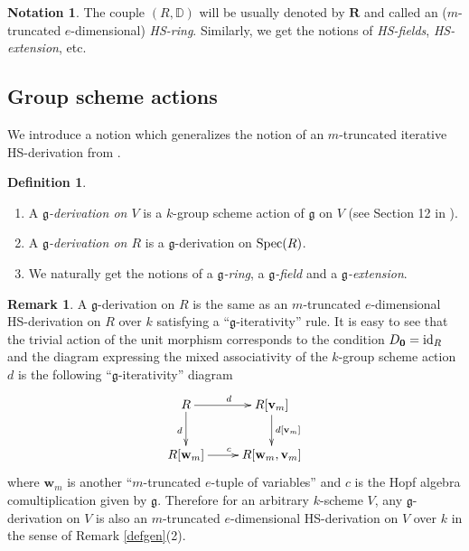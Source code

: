 \documentclass[10pt]{amsart}
\theoremstyle{definition}
\newtheorem{definition}[theorem]{Definition}
\newtheorem{remark}[theorem]{Remark}
\newtheorem{notation}[theorem]{Notation}
\begin{document}
\begin{notation}
The couple $(R,\mathbb{D})$ will be usually denoted by $\mathbf{R}$ and called an ($m$-truncated $e$-dimensional) \emph{HS-ring}. Similarly, we get the notions of \emph{HS-fields}, \emph{HS-extension}, etc.
\end{notation}



\subsection{Group scheme actions}
We introduce a notion which generalizes the notion of an $m$-truncated iterative HS-derivation from \cite{K3}.
\begin{definition}
\begin{enumerate}
\item A \emph{$\mathfrak{g}$-derivation on $V$} is a $k$-group scheme action of $\mathfrak{g}$ on $V$ (see Section 12 in \cite{MuAbel}).

\item A \emph{$\mathfrak{g}$-derivation on $R$} is a $\mathfrak{g}$-derivation on $\operatorname{Spec}(R)$.

\item We naturally get the notions of a \emph{$\mathfrak{g}$-ring}, a \emph{$\mathfrak{g}$-field} and a \emph{$\mathfrak{g}$-extension}.
\end{enumerate}
\end{definition}
\begin{remark}\label{gderint}
A $\mathfrak{g}$-derivation on $R$ is the same as an $m$-truncated $e$-dimensional
HS-derivation on $R$ over $k$ satisfying a ``$\mathfrak{g}$-iterativity'' rule. It is easy to see that the trivial action of the unit morphism corresponds
to the condition $D_{\mathbf{0}}=\operatorname{id}_R$ and the diagram expressing the mixed associativity of the $k$-group scheme action $d$ is the following ``$\mathfrak{g}$-iterativity'' diagram
\begin{equation*}
\xymatrix{R \ar[r]^d \ar[d]_d & R[\mathbf{v}_m] \ar[d]^{d[\mathbf{v}_m]}
 \\ R[\mathbf{w}_m]\ar[r]^{c} & R[\mathbf{w}_m,\mathbf{v}_m]}
\end{equation*}
where $\mathbf{w}_m$ is another ``$m$-truncated $e$-tuple of variables'' and $c$ is the Hopf algebra comultiplication given by $\mathfrak{g}$. Therefore for an arbitrary $k$-scheme $V$, any $\mathfrak{g}$-derivation on $V$ is also an $m$-truncated $e$-dimensional HS-derivation on $V$ over $k$ in the sense of Remark \ref{defgen}(2).
\end{remark}
\end{document}

